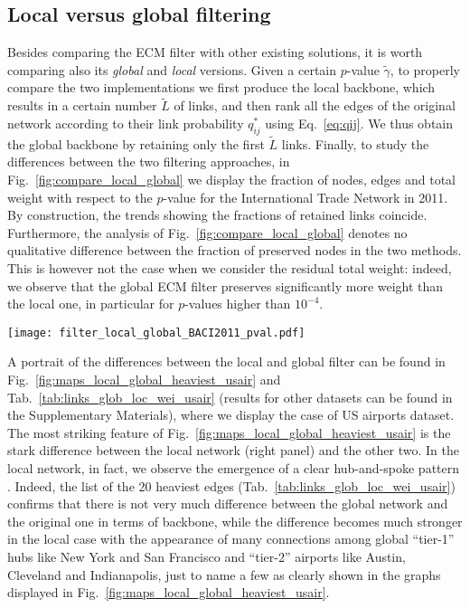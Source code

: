 \documentclass[aps,twocolumn,superscriptaddress]{revtex4-1}
\begin{document}
\subsection{Local versus global filtering}
Besides comparing the ECM filter with other existing solutions, it is worth comparing also its \emph{global} and \emph{local} versions. Given a certain $p$-value $\widetilde{\gamma}$, to properly compare the two implementations we first produce the local backbone, which results in a certain number $\widetilde{L}$ of links, and then rank all the edges of the original network according to their link probability $q^*_{ij}$ using Eq.~\eqref{eq:qij}.
We thus obtain the global backbone by retaining only the first $\widetilde{L}$ links. 
Finally, to study the differences between the two filtering approaches, in Fig.~\ref{fig:compare_local_global} we display the fraction of nodes, edges and total weight with respect to the $p$-value for the International Trade Network in 2011. By construction, the trends showing the fractions of retained links coincide. Furthermore, the analysis of Fig.~\ref{fig:compare_local_global} denotes no qualitative difference between the fraction of preserved nodes in the two methods. This is however not the case when we consider the residual total weight: indeed, we observe that the global ECM filter preserves significantly more weight than the local one, in particular for $p$-values higher than $ 10^{-4}$.
%
%
\begin{figure*}[t]
\centering
%
\texttt{[image: filter\_local\_global\_BACI2011\_pval.pdf]}
%
\caption{Effects of the global and local implementations of the ECM filter on three topological indicators: fraction of nodes ${N}/{N_0}$ (blue dots), links ${L}/{L_0}$ (red diamonds), and total weight ${W}/{W_0}$ (green squares) as a function of the $p$-value $\widetilde{\gamma}$. Filled symbols refer to the local filter and empty symbols to the global one.}
\label{fig:compare_local_global}
\end{figure*}
%
%

A portrait of the differences between the local and global filter can be found in Fig.~\ref{fig:maps_local_global_heaviest_usair} and Tab.~\ref{tab:links_glob_loc_wei_usair} (results for other datasets can be found in the Supplementary Materials), where we display the case of US airports dataset. The most striking feature of Fig.~\ref{fig:maps_local_global_heaviest_usair} is the stark difference between the local network (right panel) and the other two. In the local network, in fact, we observe the emergence of a clear hub-and-spoke pattern \cite{bryan-jregsci-1999}. Indeed, the list of the 20 heaviest edges (Tab.~\ref{tab:links_glob_loc_wei_usair}) confirms that there is not very much difference between the global network and the original one in terms of backbone, while the difference becomes much stronger in the local case with the appearance of many connections among global ``tier-1'' hubs like New York and San Francisco and ``tier-2'' airports like Austin, Cleveland and Indianapolis, just to name a few as clearly shown in the graphs displayed in Fig.~\ref{fig:maps_local_global_heaviest_usair}.
\end{document}
